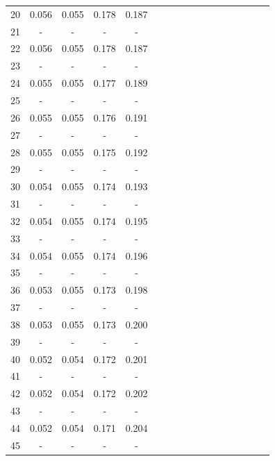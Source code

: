 \documentclass{report}
\begin{document}
\begin{table}
\begin{tabular}{|c|cccc|cccc|cccc|cccc|}
20 & 0.056 & 0.055 & 0.178 & 0.187 & & & & & & & & & & & &\\
21 &   -   &   -   &   -   &   -   & & & & & & & & & & & &\\
22 & 0.056 & 0.055 & 0.178 & 0.187 & & & & & & & & & & & &\\
23 &   -   &   -   &   -   &   -   & & & & & & & & & & & &\\
24 & 0.055 & 0.055 & 0.177 & 0.189 & & & & & & & & & & & &\\
25 &   -   &   -   &   -   &   -   & & & & & & & & & & & &\\
26 & 0.055 & 0.055 & 0.176 & 0.191 & & & & & & & & & & & &\\
27 &   -   &   -   &   -   &   -   & & & & & & & & & & & &\\
28 & 0.055 & 0.055 & 0.175 & 0.192 & & & & & & & & & & & &\\
29 &   -   &   -   &   -   &   -   & & & & & & & & & & & &\\
30 & 0.054 & 0.055 & 0.174 & 0.193 & & & & & & & & & & & &\\
31 &   -   &   -   &   -   &   -   & & & & & & & & & & & &\\
32 & 0.054 & 0.055 & 0.174 & 0.195 & & & & & & & & & & & &\\
33 &   -   &   -   &   -   &   -   & & & & & & & & & & & &\\
34 & 0.054 & 0.055 & 0.174 & 0.196 & & & & & & & & & & & &\\
35 &   -   &   -   &   -   &   -   & & & & & & & & & & & &\\
36 & 0.053 & 0.055 & 0.173 & 0.198 & & & & & & & & & & & &\\
37 &   -   &   -   &   -   &   -   & & & & & & & & & & & &\\
38 & 0.053 & 0.055 & 0.173 & 0.200 & & & & & & & & & & & &\\
39 &   -   &   -   &   -   &   -   & & & & & & & & & & & &\\
40 & 0.052 & 0.054 & 0.172 & 0.201 & & & & & & & & & & & &\\
41 &   -   &   -   &   -   &   -   & & & & & & & & & & & &\\
42 & 0.052 & 0.054 & 0.172 & 0.202 & & & & & & & & & & & &\\
43 &   -   &   -   &   -   &   -   & & & & & & & & & & & &\\
44 & 0.052 & 0.054 & 0.171 & 0.204 & & & & & & & & & & & &\\
45 &   -   &   -   &   -   &   -   & & & & & & & & & & & &\\

\end{tabular}
\end{table}
\end{document}
